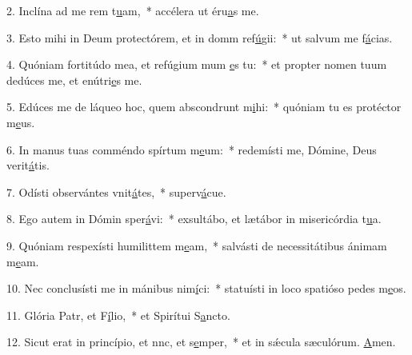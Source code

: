 2. Inclína ad me rem t\uline{u}am,~* accélera ut éru\uline{a}s me.\par 
3. Esto mihi in Deum protectórem, et in domm ref\uline{ú}gii:~* ut salvum me f\uline{á}cias.\par 
4. Quóniam fortitúdo mea, et refúgium mum \uline{e}s tu:~* et propter nomen tuum dedúces me, et enútri\uline{e}s me.\par 
5. Edúces me de láqueo hoc, quem abscondrunt m\uline{i}hi:~* quóniam tu es protéctor m\uline{e}us.\par 
6. In manus tuas comméndo spírtum m\uline{e}um:~* redemísti me, Dómine, Deus verit\uline{á}tis.\par 
7. Odísti observántes vnit\uline{á}tes,~* superv\uline{á}cue.\par 
8. Ego autem in Dómin sper\uline{á}vi:~* exsultábo, et lætábor in misericórdia t\uline{u}a.\par 
9. Quóniam respexísti humilittem m\uline{e}am,~* salvásti de necessitátibus ánimam m\uline{e}am.\par 
10. Nec conclusísti me in mánibus nim\uline{í}ci:~* statuísti in loco spatióso pedes m\uline{e}os.\par 
11. Glória Patr, et F\uline{í}lio,~* et Spirítui S\uline{a}ncto.\par 
12. Sicut erat in princípio, et nnc, et s\uline{e}mper,~* et in sǽcula sæculórum. \uline{A}men.\par 

